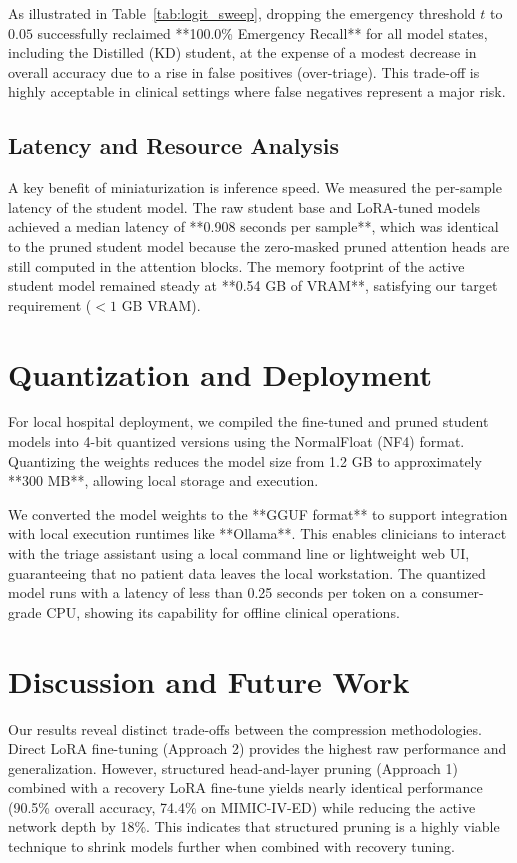 \documentclass[a4paper, 12pt]{article}
\begin{document}
As illustrated in Table~\ref{tab:logit_sweep}, dropping the emergency threshold $t$ to $0.05$ successfully reclaimed **100.0\% Emergency Recall** for all model states, including the Distilled (KD) student, at the expense of a modest decrease in overall accuracy due to a rise in false positives (over-triage). This trade-off is highly acceptable in clinical settings where false negatives represent a major risk.

\subsection{Latency and Resource Analysis}
A key benefit of miniaturization is inference speed. We measured the per-sample latency of the student model. The raw student base and LoRA-tuned models achieved a median latency of **0.908 seconds per sample**, which was identical to the pruned student model because the zero-masked pruned attention heads are still computed in the attention blocks. The memory footprint of the active student model remained steady at **0.54 GB of VRAM**, satisfying our target requirement ($<1$ GB VRAM).

\section{Quantization and Deployment}
\label{sec:deployment}

For local hospital deployment, we compiled the fine-tuned and pruned student models into 4-bit quantized versions using the NormalFloat (NF4) format. Quantizing the weights reduces the model size from 1.2 GB to approximately **300 MB**, allowing local storage and execution.

We converted the model weights to the **GGUF format** to support integration with local execution runtimes like **Ollama**. This enables clinicians to interact with the triage assistant using a local command line or lightweight web UI, guaranteeing that no patient data leaves the local workstation. The quantized model runs with a latency of less than 0.25 seconds per token on a consumer-grade CPU, showing its capability for offline clinical operations.

\section{Discussion and Future Work}
\label{sec:discussion}

Our results reveal distinct trade-offs between the compression methodologies. Direct LoRA fine-tuning (Approach 2) provides the highest raw performance and generalization. However, structured head-and-layer pruning (Approach 1) combined with a recovery LoRA fine-tune yields nearly identical performance (90.5\% overall accuracy, 74.4\% on MIMIC-IV-ED) while reducing the active network depth by 18\%. This indicates that structured pruning is a highly viable technique to shrink models further when combined with recovery tuning.
\end{document}
